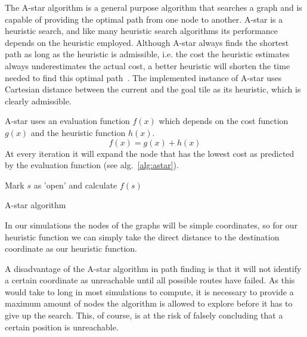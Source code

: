 			The A-star algorithm is a general purpose algorithm that searches a graph and is capable of providing the optimal path from one node to another. A-star is a heuristic search, and like many heuristic search algorithms its performance depends on the heuristic employed. Although A-star always finds the shortest path as long as the heuristic is admissible, i.e. the cost the heuristic estimates always underestimates the actual cost, a better heuristic will shorten the time needed to find this optimal path~\cite{hart1968}. The implemented instance of A-star uses Cartesian distance between the current and the goal tile as its heuristic, which is clearly admissible.

			A-star uses an evaluation function $f(x)$ which depends on the cost function $g(x)$ and the heuristic function $h(x)$.
			\begin{equation}
				\label{eq:astarevaluation}
			 	f(x) = g(x) + h(x)
			\end{equation} 
			At every iteration it will expand the node that has the lowest cost as predicted by the evaluation function (see alg.~\ref{alg:astar}).

			\begin{algorithm}
				Mark $s$ as 'open' and calculate $f(s)$\;
				\caption{A-star algorithm~\protect\cite{hart1968}}
				\label{alg:astar}
			\end{algorithm}

			In our simulations the nodes of the graphs will be simple coordinates, so for our heuristic function we can simply take the direct distance to the destination coordinate as our heuristic function.

			A disadvantage of the A-star algorithm in path finding is that it will not identify a certain coordinate as unreachable until all possible routes have failed. As this would take to long in most simulations to compute, it is necessary to provide a maximum amount of nodes the algorithm is allowed to explore before it has to give up the search. This, of course, is at the risk of falsely concluding that a certain position is unreachable.

